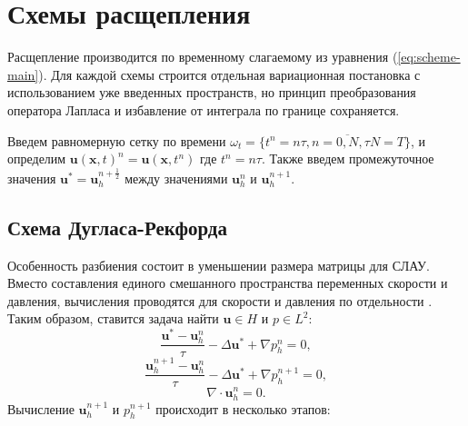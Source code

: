 \documentclass[12pt]{article}
\begin{document}
\section{Схемы расщепления}
Расщепление производится по временному слагаемому из уравнения (\ref{eq:scheme-main}). Для каждой схемы строится отдельная вариационная постановка с использованием уже введенных пространств, но принцип преобразования оператора Лапласа и избавление от интеграла по границе сохраняется.

Введем равномерную сетку по времени $\omega_t=\{t^n=n\tau, n=\overline{0,N}, \tau N = T \}$, и определим ${\bm u}({\bm x},t)^n={\bm u}({\bm x}, t^n)$ где $t^n=n\tau$. Также введем промежуточное значения ${\bm u}^*={\bm u}_h^{n+\frac{1}{2}}$ между значениями ${\bm u}_h^n$ и ${\bm u}_h^{n+1}$.

\subsection{Схема Дугласа-Рекфорда}
Особенность разбиения состоит в уменьшении размера матрицы для СЛАУ. Вместо составления единого смешанного пространства переменных скорости и давления, вычисления проводятся для скорости и давления по отдельности \cite{vabishchevich-1999}. Таким образом, ставится задача найти ${\bm u} \in H$ и $p \in L^2$:
\begin{equation} \label{eq:scheme-douglas-1}
\frac{{\bm u}^{*}-{\bm u}_h^n}{\tau} - \Delta {\bm u}^{*}+{\nabla}p_h^n=0,
\end{equation}
\begin{equation} \label{eq:scheme-douglas-2}
\frac{{\bm u}_h^{n+1}-{\bm u}_h^n}{\tau} - \Delta {\bm u}^{*}+{\nabla}p_h^{n+1}=0,
\end{equation}
\begin{equation} \label{eq:scheme-douglas-3}
\nabla \cdot {\bm u}_h^n = 0.
\end{equation}
Вычисление ${\bm u}_h^{n+1}$ и $p_h^{n+1}$ происходит в несколько этапов:
\end{document}
